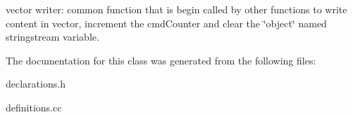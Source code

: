 vector writer\-: common function that is begin called by other functions to write content in vector, increment the cmd\-Counter and clear the \char`\"{}object\char`\"{} named stringstream variable. 

\-The documentation for this class was generated from the following files\-:\begin{DoxyCompactItemize}
\item 
declarations.\-h\item 
definitions.\-cc\end{DoxyCompactItemize}
